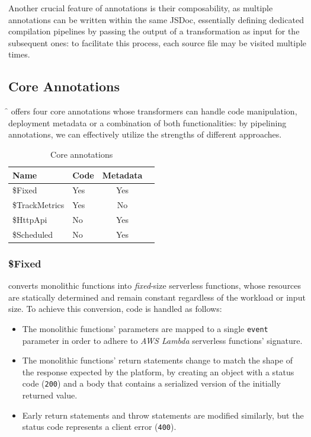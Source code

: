 Another crucial feature of annotations is their composability,
as multiple annotations can be written within the same JSDoc,
essentially defining dedicated compilation pipelines by passing the output
of a transformation as input for the subsequent ones:
to facilitate this process, each source file may be visited multiple times.

\subsection{Core Annotations}

\f{} offers four core annotations whose transformers can handle code manipulation,
deployment metadata or a combination of both functionalities:
by pipelining annotations, we can effectively utilize the strengths of different approaches.

\begin{table}[htbp]
    \centering
    \caption{Core annotations}
    \begin{tabular}{llcc}
        \toprule
        \textbf{Name} & \textbf{Code} & \textbf{Metadata} \\
        \midrule
        \$Fixed & Yes & Yes \\
        \$TrackMetrics & Yes & No \\
        \$HttpApi & No & Yes \\
        \$Scheduled & No & Yes \\
        \bottomrule
    \end{tabular}
\end{table}

\subsubsection{\$Fixed}
converts monolithic functions into \textit{fixed}-size serverless functions,
whose resources are statically determined and remain constant regardless of the workload or input size.
To achieve this conversion, code is handled as follows:
\begin{itemize}
  \item The monolithic functions' parameters are mapped to a single \verb|event|
    parameter in order to adhere to \textit{AWS Lambda} serverless functions' signature.
  \item The monolithic functions' return statements change to match
    the shape of the response expected by the platform,
    by creating an object with a status code (\verb|200|)
    and a body that contains a serialized version of the initially returned value.
  \item Early return statements and throw statements are modified similarly,
    but the status code represents a client error (\verb|400|).
\end{itemize}

